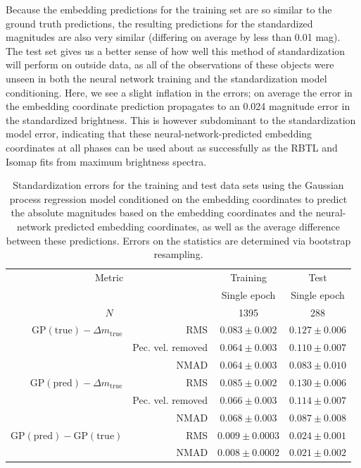 Because the embedding predictions for the training set are so similar to the ground truth predictions, the resulting predictions for the standardized magnitudes are also very similar (differing on average by less than 0.01 mag). The test set gives us a better sense of how well this method of standardization will perform on outside data, as all of the observations of these objects were unseen in both the neural network training and the standardization model conditioning. Here, we see a slight inflation in the errors; on average the error in the embedding coordinate prediction propagates to an 0.024 magnitude error in the standardized brightness. This is however subdominant to the standardization model error, indicating that these neural-network-predicted embedding coordinates at all phases can be used about as successfully as the RBTL and Isomap fits from maximum brightness spectra.

\begin{table}[htbp]
    \centering
    \begin{tabular}{rrcc}\toprule
    \multicolumn{2}{c}{Metric} & Training & Test\\
    \multicolumn{2}{c}{} & Single epoch & Single epoch\\\midrule
    \multicolumn{2}{c}{$N$} & 1395 & 288\\\midrule 
    $\textrm{GP}(\textrm{true}) - \Delta m_\textrm{true}$ & RMS & 
        $0.083\pm 0.002$ & $0.127\pm 0.006$\\
    & Pec. vel. removed &
        $0.064\pm 0.003$ & $0.110\pm 0.007$\\
    & NMAD & 
        $0.064\pm 0.003$ & $0.083\pm 0.010$\\
     $\textrm{GP}(\textrm{pred}) - \Delta m_\textrm{true}$ & RMS & 
        $0.085\pm 0.002$ & $0.130\pm 0.006$\\
    & Pec. vel. removed & 
        $0.066\pm 0.003$ & $0.114\pm 0.007$\\
    & NMAD & 
        $0.068\pm 0.003$ & $0.087\pm 0.008$\\\midrule
     $\textrm{GP}(\textrm{pred}) - \textrm{GP}(\textrm{true})$ & RMS & 
        $0.009\pm 0.0003$ & $0.024\pm 0.001$\\
    & NMAD & 
        $0.008\pm 0.0002$ & $0.021\pm 0.002$\\\bottomrule
    \end{tabular}
    \caption{Standardization errors for the training and test data sets using the Gaussian process regression model conditioned on the  embedding coordinates to predict the absolute magnitudes based on the  embedding coordinates and the \stoe{} neural-network predicted embedding coordinates, as well as the average difference between these predictions. Errors on the statistics are determined via bootstrap resampling.}
    \label{tab:standardization_nn_results}
\end{table}

